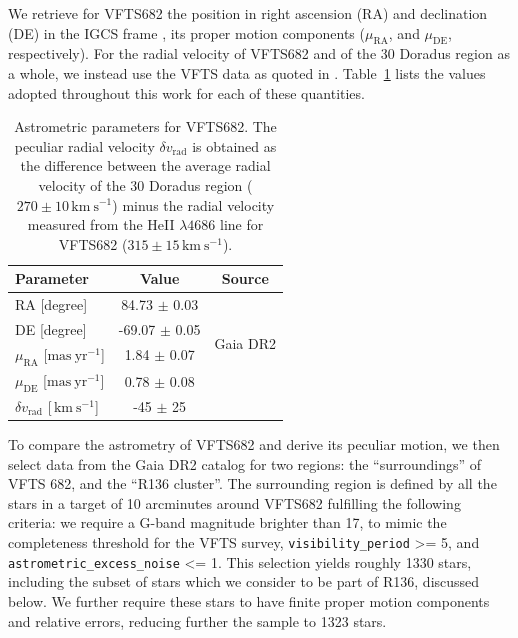 \documentclass{aa}
\newcommand{\kms}{{\,\mathrm{km\ s^{-1}}}}
\DeclareRobustCommand{\Tabref}[1]{Table~\ref{#1}}
\begin{document}

We retrieve for VFTS682 the position in right ascension (RA) and declination (DE)
in the IGCS frame \cite[][]{brown:18}, its
proper motion components ($\mu_\mathrm{RA}$, and $\mu_\mathrm{DE}$,
respectively). For the radial velocity of VFTS682 and of the 30 Doradus
region as a whole, we instead use the VFTS data
as quoted in \cite{bestenlehner:11}. \Tabref{tab:vfts682} lists the values adopted throughout
this work for each of these quantities.

\begin{table}[tbp]
  \centering
    \caption{Astrometric parameters for VFTS682. The peculiar radial
    velocity $\delta v_\mathrm{rad}$ is obtained as the difference
    between the average radial velocity of the 30 Doradus region
    ($270\pm10\kms$) minus the radial velocity measured from the HeII $\lambda4686$
    line for VFTS682 ($315\pm15\kms$).}

  \begin{tabular}[htbp]{l|c|c}
    Parameter & Value & Source\\ \hline\hline
    RA \hfill[degree] &  \phantom{-}84.73 $\pm$  0.03 & \multirow{4}{*}{Gaia DR2}\\
    DE \hfill [degree] & -69.07 $\pm$  0.05  & \\
    $\mu_\mathrm{RA}$  \hfill[$\mathrm{mas\ yr^{-1}}$] & \phantom{-0}1.84 $\pm$ 0.07 & \\
    $\mu_\mathrm{DE}$  \hfill[$\mathrm{mas\ yr^{-1}}$] & \phantom{-0}0.78 $\pm$ 0.08& \\
    $\delta v_\mathrm{rad}$  \hfill[$\kms$] & \phantom{0}-45 $\pm$ 25 & \cite{bestenlehner:11}\\
    \hline
  \end{tabular}
  \label{tab:vfts682}
\end{table}

To compare the astrometry of VFTS682 and derive its peculiar motion,
we then select data from the Gaia DR2 catalog for two regions: the
``surroundings'' of VFTS 682, and the ``R136 cluster''. The
surrounding region is defined by all the stars in a target of 10 arcminutes around
VFTS682 fulfilling the following criteria: we require a G-band
magnitude brighter than 17, to mimic the completeness threshold for
the VFTS survey, \texttt{visibility\_period} >= 5, and
\texttt{astrometric\_excess\_noise} <= 1. This selection yields
roughly 1330 stars, including the subset of stars which we consider to be
part of R136, discussed below. We further require  these stars to have finite proper
motion components and relative errors, reducing further the sample to
1323 stars. %
\end{document}
